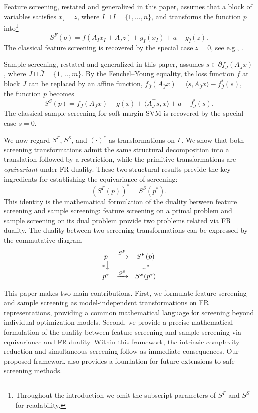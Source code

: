 Feature screening, restated and generalized in this paper, assumes
that a block of variables satisfies \(x_{\bar I}=z\), where
\(I\sqcup\bar I=\{1,\ldots,n\}\), and transforms the function \(p\)
into\footnote{Throughout the introduction we omit the subscript
parameters of \(S^F\) and \(S^S\) for readability.}
\[
    S^F(p)
    =
    f(A_Ix_I+A_{\bar I}z)
    +g_I(x_I)
    +a
    +g_{\bar I}(z).
\]
The classical feature screening is recovered by the special case
\(z=0\), see e.g., \citep{elghaoui2010}.

Sample screening, restated and generalized in this paper, assumes
\(s\in\partial f_{\bar J}(A_{\bar J}x)\), where
\(J\sqcup\bar J=\{1,\ldots,m\}\). By the Fenchel--Young equality, the loss function \(f\) at block \(\bar J\) can be replaced by an affine function, 
\(
f_{\bar J}(A_{\bar J}x)
=
\langle s,A_{\bar J}x\rangle
-
f_{\bar J}^*(s),
\)
the function \(p\) becomes
\[
    S^S(p)
    =
    f_J(A_Jx)
    +g(x)
    +\langle A_{\bar J}^{\top}s,x\rangle
    +a
    -f_{\bar J}^*(s).
\]
The classical sample screening for soft-margin SVM \citep{ogawa2013} is recovered by the special case
\(s=0\).

We now regard \(S^F\), \(S^S\), and \((\cdot)^*\) as transformations on
\(\Gamma\). We show that both screening transformations admit the same
structural decomposition into a translation followed by a restriction,
while the primitive transformations are \emph{equivariant} under FR
duality. These two structural results provide the key ingredients for
establishing the equivariance of screening:
\[
    (S^F(p))^*
    =
    S^S(p^*).
\]
This identity is the mathematical
formulation of the duality between feature screening and sample
screening: feature screening on a primal problem and 
sample screening on its dual problem provide two problems related via FR duality. The duality between two screening transformations can be expressed by the
commutative diagram
\[
\begin{array}{ccc}
p & \xrightarrow{S^F} & S^F(p)\\
{\scriptstyle *}\big\downarrow & & \big\downarrow{\scriptstyle *}\\
p^* & \xrightarrow{S^S} & S^S(p^*)
\end{array}
\]

This paper makes two main contributions. First, we formulate feature
screening and sample screening as model-independent transformations on
FR representations, providing a common mathematical language for
screening beyond individual optimization models. Second, we provide a
precise mathematical formulation of the duality between feature
screening and sample screening via equivariance and FR duality. Within this framework, the intrinsic complexity reduction and simultaneous screening follow as immediate consequences.
Our proposed framework also provides
a foundation for future extensions to safe screening methods.


